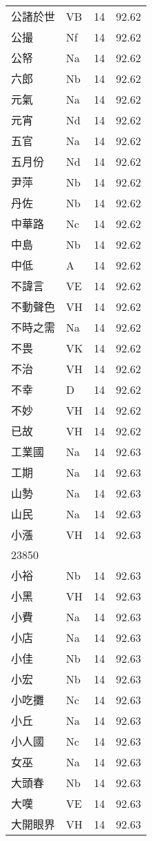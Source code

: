 \documentclass[twocolumn]{book}
\begin{document}
\begin{supertabular}{llrr}
公諸於世 & VB & 14 &  92.62\\
公撮 & Nf & 14 &  92.62\\
公帑 & Na & 14 &  92.62\\
六郎 & Nb & 14 &  92.62\\
元氣 & Na & 14 &  92.62\\
元宵 & Nd & 14 &  92.62\\
五官 & Na & 14 &  92.62\\
五月份 & Nd & 14 &  92.62\\
尹萍 & Nb & 14 &  92.62\\
丹佐 & Nb & 14 &  92.62\\
中華路 & Nc & 14 &  92.62\\
中島 & Nb & 14 &  92.62\\
中低 & A & 14 &  92.62\\
不諱言 & VE & 14 &  92.62\\
不動聲色 & VH & 14 &  92.62\\
不時之需 & Na & 14 &  92.62\\
不畏 & VK & 14 &  92.62\\
不治 & VH & 14 &  92.62\\
不幸 & D & 14 &  92.62\\
不妙 & VH & 14 &  92.62\\
已故 & VH & 14 &  92.62\\
工業國 & Na & 14 &  92.63\\
工期 & Na & 14 &  92.63\\
山勢 & Na & 14 &  92.63\\
山民 & Na & 14 &  92.63\\
小漲 & VH & 14 &  92.63\\
23850\\
小裕 & Nb & 14 &  92.63\\
小黑 & VH & 14 &  92.63\\
小費 & Na & 14 &  92.63\\
小店 & Na & 14 &  92.63\\
小佳 & Nb & 14 &  92.63\\
小宏 & Nb & 14 &  92.63\\
小吃攤 & Nc & 14 &  92.63\\
小丘 & Na & 14 &  92.63\\
小人國 & Nc & 14 &  92.63\\
女巫 & Na & 14 &  92.63\\
大頭春 & Nb & 14 &  92.63\\
大嘆 & VE & 14 &  92.63\\
大開眼界 & VH & 14 &  92.63\\

\end{supertabular}
\end{document}
